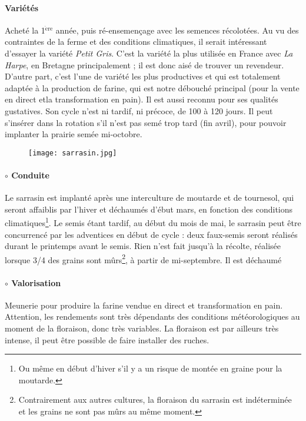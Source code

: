 \documentclass{book}
\begin{document}
\paragraph{Variétés} Acheté la 1$^{\mathrm{\grave{e}re}}$ année, puis ré-ensemençage avec les semences récolotées. Au vu des contraintes de la ferme et des conditions climatiques, il serait intéressant d'essayer la variété \textit{Petit Gris}. C'est la variété la plus utilisée en France avec \textit{La Harpe}, en Bretagne principalement ; il est donc aisé de trouver un revendeur. D'autre part, c'est l'une de variété les plus productives et qui est totalement adaptée à la production de farine, qui est notre débouché principal (pour la vente en direct etla transformation en pain). Il est aussi reconnu pour ses qualités gustatives. Son cycle n'est ni tardif, ni précoce, de 100 à 120 jours. Il peut s'insérer dans la rotation s'il n'est pas semé trop tard (fin avril), pour pouvoir implanter la prairie semée mi-octobre.

\begin{figure}[h!]
\begin{center}
	\texttt{[image: sarrasin.jpg]}
\end{center}
\end{figure}

\paragraph{$\circ$ Conduite} Le sarrasin est implanté après une interculture de moutarde et de tournesol, qui seront affaiblis par l'hiver et déchaumés d'ébut mars, en fonction des conditions climatiques\footnote{Ou même en début d'hiver s'il y a un risque de montée en graine pour la moutarde.}. Le semis étant tardif, au début du mois de mai, le sarrasin peut être concurrencé par les adventices en début de cycle : deux faux-semis seront réalisés durant le printemps avant le semis. Rien n'est fait jusqu'à la récolte, réalisée lorsque 3/4 des grains sont mûrs\footnote{Contrairement aux autres cultures, la floraison du sarrasin est indéterminée et les grains ne sont pas mûrs au même moment.}, à partir de mi-septembre. Il est déchaumé 

\paragraph{$\circ$ Valorisation} Meunerie pour produire la farine vendue en direct et transformation en pain. Attention, les rendements sont très dépendants des conditions météorologiques au moment de la floraison, donc très variables. La floraison est par ailleurs très intense, il peut être possible de faire installer des ruches.
\end{document}
